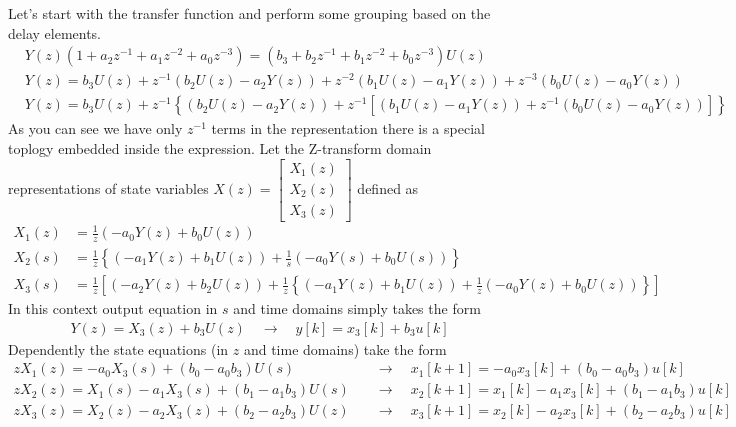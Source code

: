 \documentclass[twoside]{article}
\begin{document}
Let's start with the transfer function 
and perform some grouping based on the delay elements.
%
\begin{align*}
&Y(z) ( 1+ a_2 z^{-1} + a_1 z^{-2} + a_0 z^{-3} ) 
= ( b_3 + b_2 z^{-1} + b_1 z^{-2} + b_0 z^{-3} ) U(z)
\\
&Y(z) = b_3 U(z) + z^{-1} \left( b_2 U(z) - a_2 Y(z) \right) + z^{-2} \left( b_1 U(z) -
  a_1 Y(z) \right) + z^{-3} \left( b_0 U(z) - a_0 Y(z) \right)
\\
&Y(z) = b_3 U(z) + z^{-1} \left\lbrace \left( b_2 U(z) - a_2 Y(z) \right) + z^{-1} \left[ \left( b_1 U(z) -
  a_1 Y(z) \right) + z^{-1} \left( b_0 U(z) - a_0 Y(z) \right) \right] \right\rbrace
\end{align*}
%
As you can see we have only $z^{-1}$ terms in the representation there
is a special toplogy embedded inside the expression. Let the
Z-transform domain representations of state variables 
$X(z) = \left[ \begin{array}{c} X_1(z) \\ X_2(z) \\ X_3(z) \end{array} \right]$ defined as 
%
\begin{align*}
X_1(z) &= \frac{1}{z} \left( -a_0 Y(z) + b_0 U(z) \right)
\\
X_2(s) &= \frac{1}{z}  \left\lbrace \left( -a_1 Y(z) + b_1 U(z) \right) + 
\frac{1}{s} \left( -a_0 Y(s) + b_0 U(s) \right) \right\rbrace
\\
X_3(s) &= \frac{1}{z} \left[ \left( -a_2 Y(z) + b_2 U(z) \right) + \frac{1}{z}  \left\lbrace \left( -a_1 Y(z) + b_1 U(z) \right) + 
\frac{1}{z} \left( -a_0 Y(z) + b_0 U(z) \right) \right\rbrace \right]
\end{align*}
%
In this context output equation in $s$ and time domains simply takes the form
%
\begin{align*}
	Y(z) = X_3(z) + b_3 U(z) \quad \rightarrow \quad y[k] = x_3[k] + b_3 u[k]
\end{align*}
% 
Dependently the state equations (in $z$ and time domains) take the form
%
%
\begin{align*}
z X_1(z) = -a_0 X_3(s)  + ( b_0 - a_0 b_3) U(s) \quad &\rightarrow \quad x_1[k+1] = -a_0 x_3[k]  + ( b_0 - a_0 b_3) u[k]
\\
z X_2(z) = X_1(s)  -a_1 X_3(s) + ( b_1 - a_1 b_3 ) U(s)  \quad &\rightarrow \quad x_2[k+1] = x_1[k]  - a_1 x_3[k] + ( b_1 - a_1 b_3 ) u[k]
\\
z X_3(z) = X_2(z)  -a_2 X_3(z) + ( b_2 - a_2 b_3 ) U(z)  \quad &\rightarrow \quad x_3[k+1] = x_2[k]  - a_2 x_3[k] + ( b_2 - a_2 b_3 ) u[k]
\end{align*}
\end{document}

